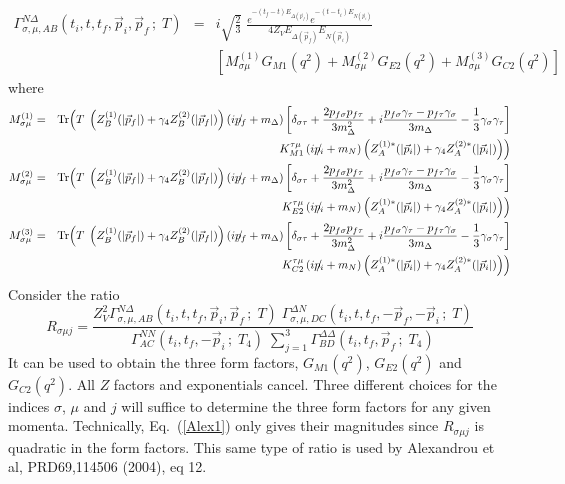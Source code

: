 \documentclass[12pt]{article}
\begin{document}
\begin{eqnarray}
\Gamma^{N\Delta}_{\sigma,\mu,AB}(t_i,t,t_f,\vec{p}_i,\vec{p}_f\,;\;T)
&=& i\sqrt{\frac{2}{3}}\;
   \frac{e^{-(t_f-t)E_{\Delta(\vec{p}_f)}}e^{-(t-t_i)E_{N(\vec{p}_i)}}}
   {4Z_VE_{\Delta(\vec{p}_f)}E_{N(\vec{p}_i)}} \nonumber \\
&& \left[M^{(1)}_{\sigma\mu}G_{M1}(q^2)
        +M^{(2)}_{\sigma\mu}G_{E2}(q^2)
        +M^{(3)}_{\sigma\mu}G_{C2}(q^2)
   \right]
\end{eqnarray}
where
\begin{eqnarray}
M^{(1)}_{\sigma\mu} &=& {\rm Tr}\Bigl(T\;
     \left(Z_B^{(1)}(|\vec{p}_f|)+\gamma_4Z_B^{(2)}(|\vec{p}_f|)\right)
     \left(ip\!\!/\!_f+m_\Delta\right)
     \left[\delta_{\sigma\tau}+\frac{2p_{f\sigma}p_{f\tau}}{3m_\Delta^2} +
     i\frac{p_{f\sigma}\gamma_\tau - p_{f\tau}\gamma_\sigma}{3m_\Delta} - 
     \frac{1}{3}\gamma_\sigma \gamma_\tau \right]
     \nonumber \\ &&
     K_{M1}^{\tau\mu}
     \left(ip\!\!/\!_i+m_N\right)
     \left(Z_A^{(1)*}(|\vec{p}_i|)+\gamma_4Z_A^{(2)*}(|\vec{p}_i|)\right) \Bigr)
     \nonumber \\
M^{(2)}_{\sigma\mu} &=& {\rm Tr}\Bigl(T\;
     \left(Z_B^{(1)}(|\vec{p}_f|)+\gamma_4Z_B^{(2)}(|\vec{p}_f|)\right)
     \left(ip\!\!/\!_f+m_\Delta\right)
     \left[\delta_{\sigma\tau}+\frac{2p_{f\sigma}p_{f\tau}}{3m_\Delta^2} +
     i\frac{p_{f\sigma}\gamma_\tau - p_{f\tau}\gamma_\sigma}{3m_\Delta} - 
     \frac{1}{3}\gamma_\sigma \gamma_\tau \right]
     \nonumber \\ &&
     K_{E2}^{\tau\mu}
     \left(ip\!\!/\!_i+m_N\right)
     \left(Z_A^{(1)*}(|\vec{p}_i|)+\gamma_4Z_A^{(2)*}(|\vec{p}_i|)\right)\Bigr)
     \nonumber \\
M^{(3)}_{\sigma\mu} &=& {\rm Tr}\Bigl(T\;
     \left(Z_B^{(1)}(|\vec{p}_f|)+\gamma_4Z_B^{(2)}(|\vec{p}_f|)\right)
     \left(ip\!\!/\!_f+m_\Delta\right)
     \left[\delta_{\sigma\tau}+\frac{2p_{f\sigma}p_{f\tau}}{3m_\Delta^2} +
     i\frac{p_{f\sigma}\gamma_\tau - p_{f\tau}\gamma_\sigma}{3m_\Delta} - 
     \frac{1}{3}\gamma_\sigma \gamma_\tau \right]
     \nonumber \\ &&
     K_{C2}^{\tau\mu}
     \left(ip\!\!/\!_i+m_N\right)
     \left(Z_A^{(1)*}(|\vec{p}_i|)+\gamma_4Z_A^{(2)*}(|\vec{p}_i|)\right)\Bigr)
     \nonumber
\end{eqnarray}
Consider the ratio
\begin{equation}\label{Alex1}
R_{\sigma\mu j} = \frac{Z_V^2
      \Gamma^{N\Delta}_{\sigma,\mu,AB}(t_i,t,t_f,\vec p_i,\vec p_f\,;\;T)\;
      \Gamma^{\Delta N}_{\sigma,\mu,DC}(t_i,t,t_f,-\vec p_f,-\vec p_i\,;\;T)}
      {\Gamma^{NN}_{AC}(t_i,t_f,-\vec p_i\,;\;T_4)\;
      \sum_{j=1}^3\Gamma^{\Delta\Delta}_{BD}(t_i,t_f,\vec p_f\,;\;T_4)}
\end{equation}
It can be used to obtain the three form factors, $G_{M1}(q^2)$, $G_{E2}(q^2)$
and $G_{C2}(q^2)$.  All $Z$ factors and exponentials cancel.
Three different choices for the indices $\sigma$, $\mu$ and $j$ will suffice
to determine the three form factors for any given momenta.
Technically, Eq.~(\ref{Alex1}) only gives their magnitudes since
$R_{\sigma\mu j}$ is quadratic in the form factors.  This same type of
ratio is used by Alexandrou et al, PRD69,114506 (2004), eq 12.
\end{document}
